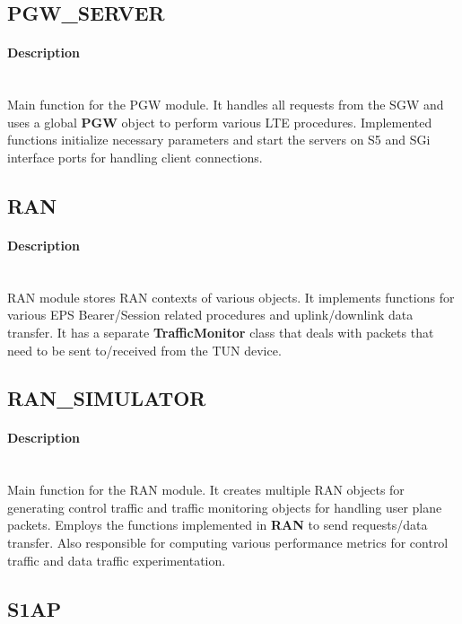 \documentclass[hidelinks]{report}
\begin{document}
\subsection*{PGW\_SERVER}

\paragraph*{Description}

~\\ Main function for the PGW module. It handles all requests from the SGW and uses a global \textbf{PGW} object to perform various LTE procedures. Implemented functions initialize necessary parameters and start the servers on S5 and SGi interface ports for handling client connections.

\subsection*{RAN}

\paragraph*{Description}

~\\ RAN module stores RAN contexts of various objects. It implements functions for various EPS Bearer/Session related procedures and uplink/downlink data transfer. It has a separate \textbf{TrafficMonitor} class that deals with packets that need to be sent to/received from the TUN device.

\subsection*{RAN\_SIMULATOR}

\paragraph*{Description}

~\\ Main function for the RAN module. It creates multiple RAN objects for generating control traffic and traffic monitoring objects for handling user plane packets. Employs the functions implemented in \textbf{RAN} to send requests/data transfer. Also responsible for computing various performance metrics for control traffic and data traffic experimentation.

\subsection*{S1AP}
\end{document}
